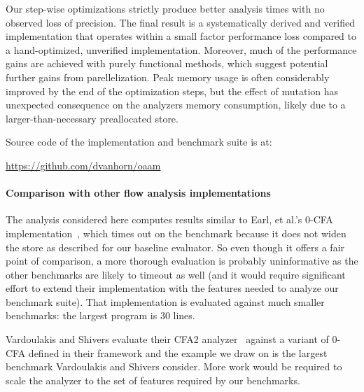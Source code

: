 \documentclass[9pt]{sigplanconf} %
\begin{document}
Our step-wise optimizations strictly produce better analysis times with no observed loss of precision.
%
The final result is a systematically derived and verified implementation that operates within a small factor performance loss compared to a hand-optimized, unverified implementation.
%
Moreover, much of the performance gains are achieved with purely functional methods, which suggest potential further gains from parellelization.
%
Peak memory usage is often considerably improved by the end of the optimization steps, but the effect of mutation has unexpected consequence on the analyzers memory consumption, likely due to a larger-than-necessary preallocated store.

Source code of the implementation and benchmark suite is at:

\begin{center}
\url{https://github.com/dvanhorn/oaam}
\end{center}

\paragraph{Comparison with other flow analysis implementations}

The analysis considered here computes results similar to Earl, et al.'s 0-CFA implementation~\cite{dvanhorn:Earl2012Introspective}, which times out on the \Church{} benchmark because it does not widen the store as described for our baseline evaluator.
%
So even though it offers a fair point of comparison, a more thorough evaluation is probably uninformative as the other benchmarks are likely to timeout as well (and it would require significant effort to extend their implementation with the features needed to analyze our benchmark suite).
%
That implementation is evaluated against much smaller benchmarks: the largest program is 30 lines.

Vardoulakis and Shivers evaluate their CFA2 analyzer~\cite{dvanhorn:Vardoulakis2011CFA2} against a variant of 0-CFA defined in their framework and the example we draw on is the largest benchmark Vardoulakis and Shivers consider.
%
More work would be required to scale the analyzer to the set of features required by our benchmarks.
\end{document}
